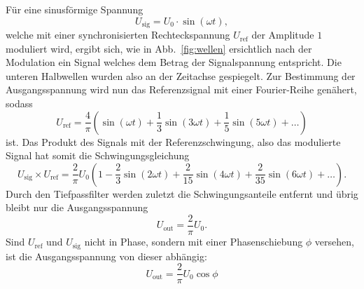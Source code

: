 Für eine sinusförmige Spannung
\begin{equation}
  U_\mathrm{sig} = U_0 \cdot \sin (\omega t),
\end{equation}
welche mit einer synchronisierten Rechteckspannung $U_\mathrm{ref}$ der Amplitude $1$ moduliert wird, ergibt sich, wie in Abb.~\ref{fig:wellen} ersichtlich nach der Modulation ein Signal welches dem Betrag der Signalspannung entspricht. Die unteren Halbwellen wurden also an der Zeitachse gespiegelt.
Zur Bestimmung der Ausgangsspannung wird nun das Referenzsignal mit einer Fourier-Reihe genähert, sodass
\begin{equation}
  U_\mathrm{ref} = \frac{4}{\pi} \left( \sin(\omega t) + \frac{1}{3} \sin(3\omega t) + \frac{1}{5} \sin(5\omega t) + … \right)
\end{equation}
ist. Das Produkt des Signals mit der Referenzschwingung, also das modulierte Signal hat somit die Schwingungsgleichung
\begin{equation}
  U_\mathrm{sig} \times U_\mathrm{ref} = \frac{2}{\pi} U_0 \left( 1 - \frac{2}{3} \sin(2 \omega t) + \frac{2}{15} \sin(4\omega t) + \frac{2}{35} \sin(6\omega t) + … \right).
\end{equation}
Durch den Tiefpassfilter werden zuletzt die Schwingungsanteile entfernt und übrig bleibt nur die Ausgangsspannung
\begin{equation}
  U_\mathrm{out} = \frac{2}{\pi} U_0.
\end{equation}
Sind $U_\mathrm{ref}$ und $U_\mathrm{sig}$ nicht in Phase, sondern mit einer Phasenschiebung $\phi$ versehen, ist die Ausgangsspannung von dieser abhängig:
\begin{equation}
  \label{eqn:ganzwichtig}
  U_\mathrm{out} = \frac{2}{\pi} U_0 \cos \phi
\end{equation}
